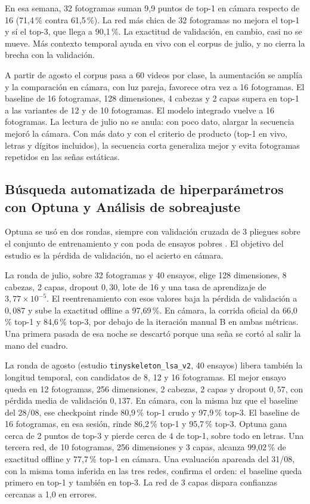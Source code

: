 En esa semana, 32 fotogramas suman 9{,}9 puntos de top-1 en cámara respecto de 16 (71{,}4\,\% contra 61{,}5\,\%). La red más chica de 32 fotogramas no mejora el top-1 y sí el top-3, que llega a 90{,}1\,\%. La exactitud de validación, en cambio, casi no se mueve. Más contexto temporal ayuda en vivo con el corpus de julio, y no cierra la brecha con la validación.

A partir de agosto el corpus pasa a 60 videos por clase, la aumentación se amplía y la comparación en cámara, con luz pareja, favorece otra vez a 16 fotogramas. El baseline de 16 fotogramas, 128 dimensiones, 4 cabezas y 2 capas supera en top-1 a las variantes de 12 y de 10 fotogramas. El modelo integrado vuelve a 16 fotogramas. La lectura de julio no se anula: con poco dato, alargar la secuencia mejoró la cámara. Con más dato y con el criterio de producto (top-1 en vivo, letras y dígitos incluidos), la secuencia corta generaliza mejor y evita fotogramas repetidos en las señas estáticas.

\subsection{Búsqueda automatizada de hiperparámetros con Optuna y Análisis de sobreajuste}

Optuna se usó en dos rondas, siempre con validación cruzada de 3 pliegues sobre el conjunto de entrenamiento y con poda de ensayos pobres \parencite{akiba2019optuna}. El objetivo del estudio es la pérdida de validación, no el acierto en cámara.

La ronda de julio, sobre 32 fotogramas y 40 ensayos, elige 128 dimensiones, 8 cabezas, 2 capas, dropout $0{,}30$, lote de 16 y una tasa de aprendizaje de $3{,}77 \times 10^{-5}$. El reentrenamiento con esos valores baja la pérdida de validación a $0{,}087$ y sube la exactitud offline a 97{,}69\,\%. En cámara, la corrida oficial da 66{,}0\,\% top-1 y 84{,}6\,\% top-3, por debajo de la iteración manual B en ambas métricas. Una primera pasada de esa noche se descartó porque una seña se cortó al salir la mano del cuadro.

La ronda de agosto (estudio \texttt{tinyskeleton\_lsa\_v2}, 40 ensayos) libera también la longitud temporal, con candidatos de 8, 12 y 16 fotogramas. El mejor ensayo queda en 12 fotogramas, 256 dimensiones, 2 cabezas, 2 capas y dropout $0{,}57$, con pérdida media de validación $0{,}137$. En cámara, con la misma luz que el baseline del 28/08, ese checkpoint rinde 80{,}9\,\% top-1 crudo y 97{,}9\,\% top-3. El baseline de 16 fotogramas, en esa sesión, rinde 86{,}2\,\% top-1 y 95{,}7\,\% top-3. Optuna gana cerca de 2 puntos de top-3 y pierde cerca de 4 de top-1, sobre todo en letras. Una tercera red, de 10 fotogramas, 256 dimensiones y 3 capas, alcanza 99{,}02\,\% de exactitud offline y 77{,}7\,\% top-1 en cámara. Una evaluación apareada del 31/08, con la misma toma inferida en las tres redes, confirma el orden: el baseline queda primero en top-1 y también en top-3. La red de 3 capas dispara confianzas cercanas a 1{,}0 en errores.

